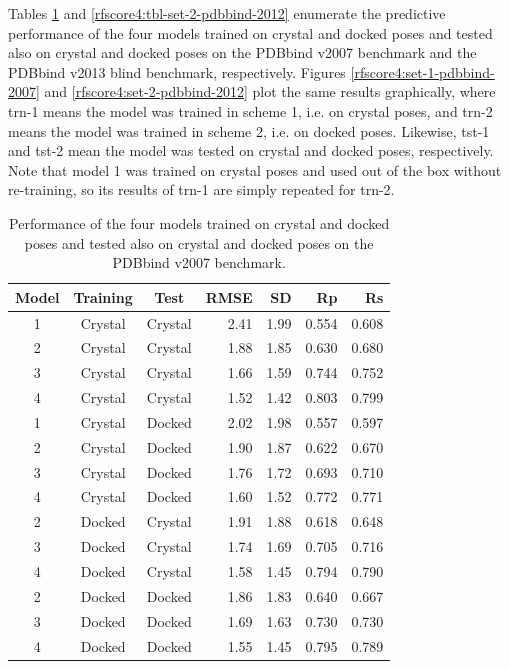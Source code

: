 Tables \ref{rfscore4:tbl-set-1-pdbbind-2007} and \ref{rfscore4:tbl-set-2-pdbbind-2012} enumerate the predictive performance of the four models trained on crystal and docked poses and tested also on crystal and docked poses on the PDBbind v2007 benchmark and the PDBbind v2013 blind benchmark, respectively. Figures \ref{rfscore4:set-1-pdbbind-2007} and \ref{rfscore4:set-2-pdbbind-2012} plot the same results graphically, where trn-1 means the model was trained in scheme 1, i.e. on crystal poses, and trn-2 means the model was trained in scheme 2, i.e. on docked poses. Likewise, tst-1 and tst-2 mean the model was tested on crystal and docked poses, respectively. Note that model 1 was trained on crystal poses and used out of the box without re-training, so its results of trn-1 are simply repeated for trn-2.

\begin{table}
\caption{Performance of the four models trained on crystal and docked poses and tested also on crystal and docked poses on the PDBbind v2007 benchmark.}
\label{rfscore4:tbl-set-1-pdbbind-2007}
\begin{tabular}{cccrrrr}
\hline
Model & Training & Test & RMSE & SD & Rp & Rs\\
\hline
1 & Crystal & Crystal & 2.41 & 1.99 & 0.554 & 0.608\\
2 & Crystal & Crystal & 1.88 & 1.85 & 0.630 & 0.680\\
3 & Crystal & Crystal & 1.66 & 1.59 & 0.744 & 0.752\\
4 & Crystal & Crystal & 1.52 & 1.42 & 0.803 & 0.799\\
\hline
1 & Crystal & Docked  & 2.02 & 1.98 & 0.557 & 0.597\\
2 & Crystal & Docked  & 1.90 & 1.87 & 0.622 & 0.670\\
3 & Crystal & Docked  & 1.76 & 1.72 & 0.693 & 0.710\\
4 & Crystal & Docked  & 1.60 & 1.52 & 0.772 & 0.771\\
\hline
2 & Docked  & Crystal & 1.91 & 1.88 & 0.618 & 0.648\\
3 & Docked  & Crystal & 1.74 & 1.69 & 0.705 & 0.716\\
4 & Docked  & Crystal & 1.58 & 1.45 & 0.794 & 0.790\\
\hline
2 & Docked  & Docked  & 1.86 & 1.83 & 0.640 & 0.667\\
3 & Docked  & Docked  & 1.69 & 1.63 & 0.730 & 0.730\\
4 & Docked  & Docked  & 1.55 & 1.45 & 0.795 & 0.789\\
\hline
\end{tabular}
\end{table}

